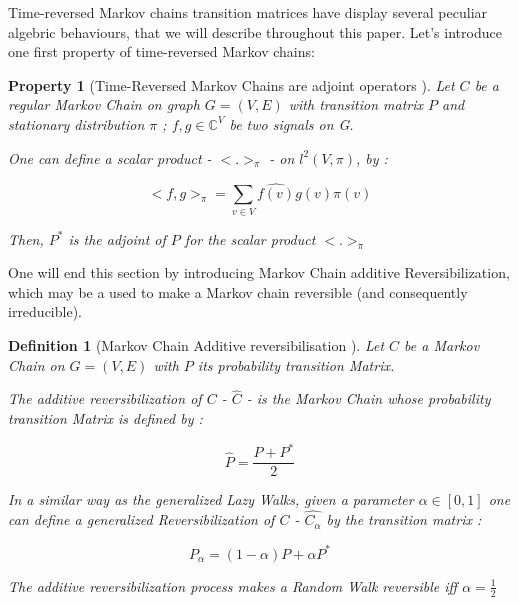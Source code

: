 \documentclass[sn-mathphys]{sn-jnl}%
\theoremstyle{thmstyleone}%
\newtheorem{propriete}[theo]{Property}
\theoremstyle{thmstyletwo}%
\theoremstyle{thmstylethree}%
\newtheorem{definition}[theo]{Definition}
\begin{document}
Time-reversed Markov chains transition matrices have display several
peculiar algebric behaviours, that we will describe throughout this
paper. Let's introduce one first property of time-reversed Markov
chains:

\begin{propriete}[Time-Reversed Markov Chains are adjoint operators \cite{sevi2019}]
  Let $C$ be a regular Markov Chain on graph $G=(V,E)$ with transition
  matrix $P$ and stationary distribution $\pi$ ;
  $f, g \in \mathbb{C}^{V}$ be two signals on G.
    
  One can define a scalar product - $<.>_{\pi}$ - on $l^2(V, \pi)$, by
  :
    
    \begin{equation}
        <f,g>_{\pi} = \sum_{v \in V} \hat{f(v)}g(v)\pi(v)
    \end{equation}

Then, $P^*$ is the adjoint of $P$ for the scalar product $<.>_{\pi}$

\end{propriete}

One will end this section by introducing Markov Chain additive
Reversibilization, which may be a used to make a Markov chain
reversible (and consequently irreducible).

\begin{definition}[Markov Chain Additive reversibilisation \cite{sevi2019}]
  Let $C$ be a Markov Chain on $G=(V,E)$ with $P$ its probability
  transition Matrix.

  The additive reversibilization of $C$ - $\hat{C}$ - is the Markov
  Chain whose probability transition Matrix is defined by :

\begin{equation}
    \hat{P} = \frac{P + P^*}{2}
\end{equation}

In a similar way as the generalized Lazy Walks, given a parameter
$\alpha \in [0,1]$ one can define a generalized Reversibilization of
$C$ - $\hat{C_\alpha}$ by the transition matrix :

\begin{equation}
    \hat{P_\alpha} = (1-\alpha) P + \alpha P^*
\end{equation}

The additive reversibilization process makes a Random Walk reversible iff $\alpha = \frac{1}{2}$

\end{definition}
\end{document}
